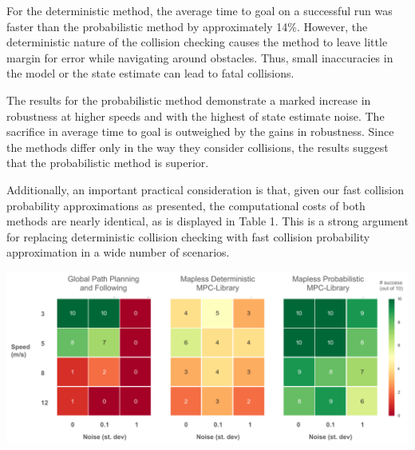 \documentclass{llncs}
\begin{document}
For the deterministic method, the average time to goal on a successful run was faster than the probabilistic method by approximately 14\%.   However, the deterministic nature of the collision checking causes the method to leave little margin for error while navigating around obstacles.  Thus, small inaccuracies in the model or the state estimate can lead to fatal collisions.  

The results for the probabilistic method demonstrate a marked increase in robustness at higher speeds and with the highest of state estimate noise.  The sacrifice in average time to goal is outweighed by the gains in robustness. Since the methods differ only in the way they consider collisions, the results suggest that the probabilistic method is superior.  

Additionally, an important practical consideration is that, given our fast collision probability approximations as presented, the computational costs of both methods are nearly identical, as is displayed in Table 1.  This is a strong argument for replacing deterministic collision checking with fast collision probability approximation in a wide number of scenarios.

\begin{center}
  \includegraphics[keepaspectratio=true,scale=0.55]{images/success_heatmap_3.pdf}
  \label{success_heatmap}%
\end{center}
\end{document}
